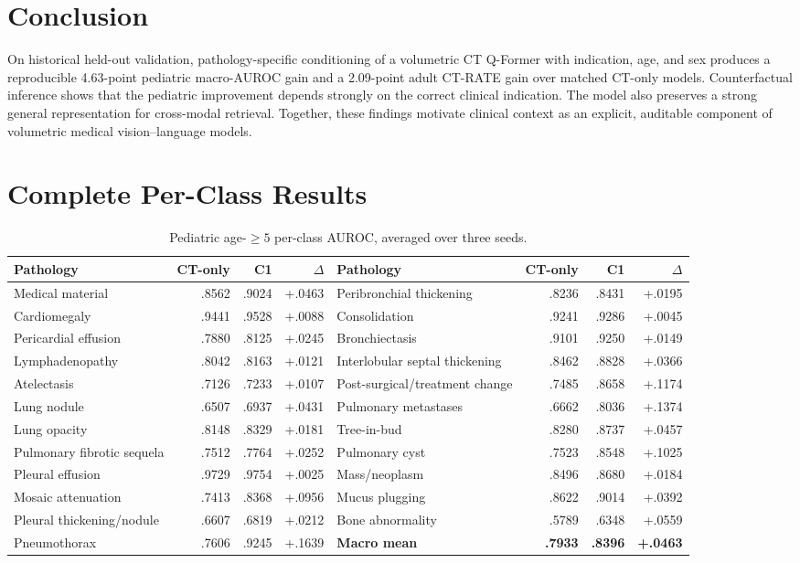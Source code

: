 \documentclass[10pt,twocolumn]{article}
\begin{document}
\section{Conclusion}
On historical held-out validation, pathology-specific conditioning of a
volumetric CT Q-Former with indication, age, and sex produces a reproducible
4.63-point pediatric macro-AUROC gain and
a 2.09-point adult CT-RATE gain over matched CT-only models. Counterfactual
inference shows that the pediatric improvement depends strongly on the correct
clinical indication. The model also preserves a strong general representation
for cross-modal retrieval. Together, these findings motivate clinical context
as an explicit, auditable component of volumetric medical vision--language
models.

\appendix
\section{Complete Per-Class Results}

\begin{table}[t]
\centering
\caption{Pediatric age-$\geq5$ per-class AUROC, averaged over three seeds.}
\label{tab:pedsclass}
\begin{tabular}{@{}lrrr@{\hspace{1.0cm}}lrrr@{}}
\toprule
Pathology & CT-only & C1 & $\Delta$ & Pathology & CT-only & C1 & $\Delta$ \\
\midrule
Medical material & .8562 & .9024 & +.0463 & Peribronchial thickening & .8236 & .8431 & +.0195 \\
Cardiomegaly & .9441 & .9528 & +.0088 & Consolidation & .9241 & .9286 & +.0045 \\
Pericardial effusion & .7880 & .8125 & +.0245 & Bronchiectasis & .9101 & .9250 & +.0149 \\
Lymphadenopathy & .8042 & .8163 & +.0121 & Interlobular septal thickening & .8462 & .8828 & +.0366 \\
Atelectasis & .7126 & .7233 & +.0107 & Post-surgical/treatment change & .7485 & .8658 & +.1174 \\
Lung nodule & .6507 & .6937 & +.0431 & Pulmonary metastases & .6662 & .8036 & +.1374 \\
Lung opacity & .8148 & .8329 & +.0181 & Tree-in-bud & .8280 & .8737 & +.0457 \\
Pulmonary fibrotic sequela & .7512 & .7764 & +.0252 & Pulmonary cyst & .7523 & .8548 & +.1025 \\
Pleural effusion & .9729 & .9754 & +.0025 & Mass/neoplasm & .8496 & .8680 & +.0184 \\
Mosaic attenuation & .7413 & .8368 & +.0956 & Mucus plugging & .8622 & .9014 & +.0392 \\
Pleural thickening/nodule & .6607 & .6819 & +.0212 & Bone abnormality & .5789 & .6348 & +.0559 \\
Pneumothorax & .7606 & .9245 & +.1639 & \textbf{Macro mean} & \textbf{.7933} & \textbf{.8396} & \textbf{+.0463} \\
\bottomrule
\end{tabular}
\end{table}
\end{document}
